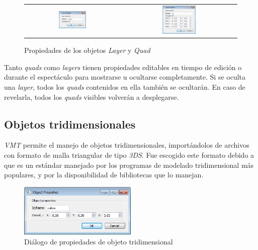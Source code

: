 \begin{figure}
	\begin{center}
		\begin{tabular}[c]{cc}
			\includegraphics[width=0.3\textwidth]{./Cap5_vmt/vmt_layerProperties.png}
				&        
			\includegraphics[width=0.3\textwidth]{./Cap5_vmt/vmt_quadProperties.png}
		\end{tabular}
	\end{center}
	\caption{Propiedades de los objetos \emph{Layer} y \emph{Quad}}
	\label{fig:VMT-LayerQuadProperties}
\end{figure}

Tanto \emph{quads} como \emph{layers} tienen propiedades editables en tiempo de edición o durante el espectáculo para mostrarse u ocultarse completamente. Si se oculta una \emph{layer}, todos los \emph{quads} contenidos en ella también se ocultarán. En caso de revelarla, todos los \emph{quads} visibles volverán a desplegarse.

\subsection{Objetos tridimensionales}

\emph{VMT} permite el manejo de objetos tridimensionales, importándolos de archivos con formato de malla triangular de tipo \emph{3DS}.
Fue escogido este formato debido a que es un estándar manejado por los programas de modelado tridimensional más populares, y por la disponibilidad de bibliotecas que lo manejan.

\begin{figure}[H]
  \centering
    \includegraphics[width=0.5\textwidth]{./Cap5_vmt/vmt_objectProperties.png}
  \caption{Diálogo de propiedades de objeto tridimensional}
  \label{fig:VMT-ObjectProperties}
\end{figure}

